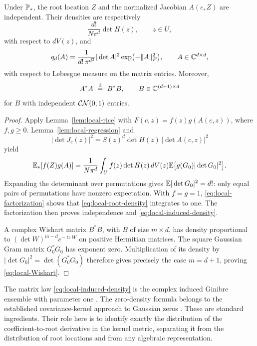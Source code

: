 \begin{theorem}\label{thm:local-universal}
  Under $\mathbb P_*$, the root location $Z$ and the normalized Jacobian $A(c,Z)$
  are independent.  Their densities are respectively
  \begin{equation}\label{eq:local-root-density}
    \frac{d!}{N\pi^d}\det H(z),\qquad z\in U,
  \end{equation}
  with respect to $dV(z)$, and
  \begin{equation}\label{eq:local-induced-density}
    q_d(A)=\frac{1}{d!\,\pi^{d^2}}
      |\det A|^2\exp\bigl(-\|A\|_F^2\bigr),
      \qquad A\in\mathbb C^{d\times d},
  \end{equation}
  with respect to Lebesgue measure on the matrix entries.  Moreover,
  \begin{equation}\label{eq:local-Wishart}
    A^*A\ \stackrel{\mathrm d}{=}\ B^*B,
    \qquad B\in\mathbb C^{(d+1)\times d}
  \end{equation}
  for $B$ with independent $\mathcal{CN}(0,1)$ entries.
\end{theorem}

\begin{proof}
  Apply Lemma~\ref{lem:local-rice} with
  $F(c,z)=f(z)g(A(c,z))$, where $f,g\geq0$.  Lemma~\ref{lem:local-regression}
  and
  \[
    |\det J_c(z)|^2=S(z)^d\det H(z)\,|\det A(c,z)|^2
  \]
  yield
  \begin{equation}\label{eq:local-factorization}
    \mathbb E_*[f(Z)g(A)]
    =\frac{1}{N\pi^d}\int_U f(z)\det H(z)\,dV(z)
      \mathbb E\bigl[g(G_0)|\det G_0|^2\bigr].
  \end{equation}
  Expanding the determinant over permutations gives
  $\mathbb E|\det G_0|^2=d!$: only equal pairs of permutations have nonzero
  expectation.  With $f=g=1$, \eqref{eq:local-factorization} shows that
  \eqref{eq:local-root-density} integrates to one.  The factorization then
  proves independence and \eqref{eq:local-induced-density}.

  A complex Wishart matrix $B^*B$, with $B$ of size $m\times d$, has density
  proportional to $(\det W)^{m-d}e^{-\operatorname{tr}W}$ on positive
  Hermitian matrices.  The square Gaussian Gram matrix $G_0^*G_0$ has exponent
  zero.  Multiplication of its density by $|\det G_0|^2=\det(G_0^*G_0)$ therefore
  gives precisely the case $m=d+1$, proving \eqref{eq:local-Wishart}.
\end{proof}

The matrix law \eqref{eq:local-induced-density} is the complex induced Ginibre
ensemble with parameter one \cite{fischmann2012induced}. The zero-density
formula belongs to the established covariance-kernel approach to Gaussian
zeros \cite{bleher2000universality,malajovich2004high}. These are standard
ingredients. Their
role here is to identify exactly the distribution of the coefficient-to-root
derivative in the kernel metric, separating it from the distribution of root
locations and from any algebraic representation.

